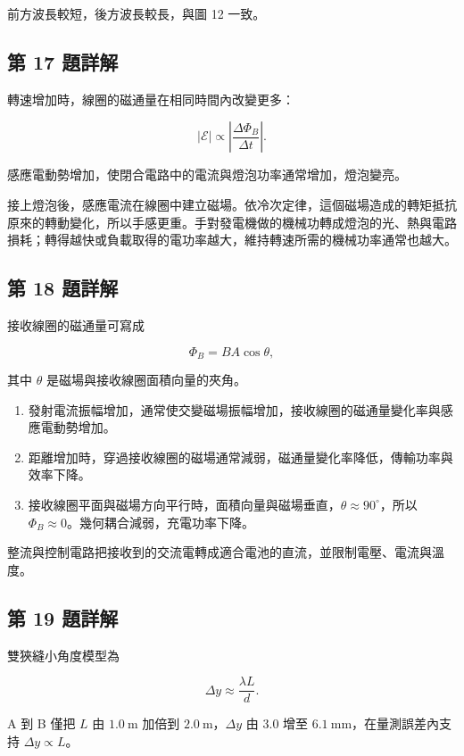 \documentclass[11pt,a4paper]{article}
\providecommand{\tightlist}{%
  \setlength{\itemsep}{0pt}\setlength{\parskip}{0pt}}
\begin{document}
前方波長較短，後方波長較長，與圖 12 一致。

\subsection{第 17 題詳解}\label{ux7b2c-17-ux984cux8a73ux89e3}

轉速增加時，線圈的磁通量在相同時間內改變更多：

\[
|\mathcal E|\propto\left|\frac{\Delta\Phi_B}{\Delta t}\right|.
\]

感應電動勢增加，使閉合電路中的電流與燈泡功率通常增加，燈泡變亮。

接上燈泡後，感應電流在線圈中建立磁場。依冷次定律，這個磁場造成的轉矩抵抗原來的轉動變化，所以手感更重。手對發電機做的機械功轉成燈泡的光、熱與電路損耗；轉得越快或負載取得的電功率越大，維持轉速所需的機械功率通常也越大。

\subsection{第 18 題詳解}\label{ux7b2c-18-ux984cux8a73ux89e3}

接收線圈的磁通量可寫成

\[
\Phi_B=BA\cos\theta,
\]

其中 \(\theta\) 是磁場與接收線圈面積向量的夾角。

\begin{enumerate}
\def\labelenumi{\arabic{enumi}.}
\tightlist
\item
  發射電流振幅增加，通常使交變磁場振幅增加，接收線圈的磁通量變化率與感應電動勢增加。
\item
  距離增加時，穿過接收線圈的磁場通常減弱，磁通量變化率降低，傳輸功率與效率下降。
\item
  接收線圈平面與磁場方向平行時，面積向量與磁場垂直，\(\theta\approx90^\circ\)，所以 \(\Phi_B\approx0\)。幾何耦合減弱，充電功率下降。
\end{enumerate}

整流與控制電路把接收到的交流電轉成適合電池的直流，並限制電壓、電流與溫度。

\subsection{第 19 題詳解}\label{ux7b2c-19-ux984cux8a73ux89e3}

雙狹縫小角度模型為

\[
\Delta y\approx\frac{\lambda L}{d}.
\]

A 到 B 僅把 \(L\) 由 \(1.0\ \mathrm m\) 加倍到 \(2.0\ \mathrm m\)，\(\Delta y\) 由 \(3.0\) 增至 \(6.1\ \mathrm{mm}\)，在量測誤差內支持 \(\Delta y\propto L\)。
\end{document}
